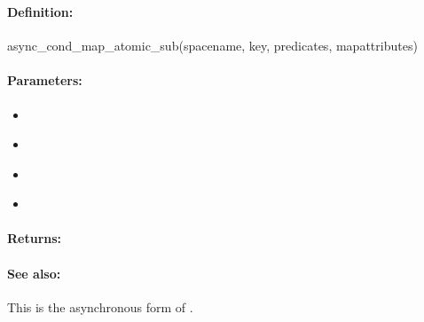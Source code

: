 \pagebreak
\subsubsection{}
\label{api:ruby:async_cond_map_atomic_sub}


\paragraph{Definition:}
\begin{rubycode}
async_cond_map_atomic_sub(spacename, key, predicates, mapattributes)
\end{rubycode}

\paragraph{Parameters:}
\begin{itemize}[noitemsep]
\item {}\\

\item {}\\

\item {}\\

\item {}\\

\end{itemize}

\paragraph{Returns:}


\paragraph{See also:}  This is the asynchronous form of .

\pagebreak
\subsubsection{}
\label{api:ruby:group_map_atomic_sub}


